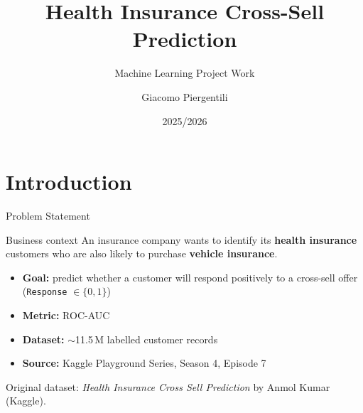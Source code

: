 \documentclass[aspectratio=169, 10pt]{beamer}
\title[Health Insurance Cross-Sell]{Health Insurance Cross-Sell Prediction}
\subtitle{Machine Learning Project Work}
\author{Giacomo Piergentili}
\date{2025/2026}
\begin{document}
\begin{frame}
  \titlepage
\end{frame}

\section{Introduction}

\begin{frame}{Problem Statement}
  \begin{block}{Business context}
    An insurance company wants to identify its \textbf{health insurance} customers
    who are also likely to purchase \textbf{vehicle insurance}.
  \end{block}

  \vspace{0.4cm}
  \begin{itemize}
    \item \textbf{Goal:} predict whether a customer will respond positively to a
          cross-sell offer (\texttt{Response} $\in \{0, 1\}$)
    \item \textbf{Metric:} ROC-AUC
    \item \textbf{Dataset:} $\sim$11.5\,M labelled customer records
    \item \textbf{Source:} Kaggle Playground Series, Season 4, Episode 7
  \end{itemize}

  \vspace{0.3cm}
  \footnotesize
  Original dataset: \textit{Health Insurance Cross Sell Prediction} by Anmol Kumar (Kaggle).
\end{frame}
\end{document}
